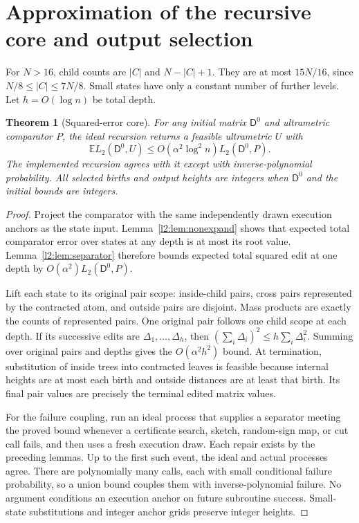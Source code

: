 \documentclass[11pt]{article}
\newtheorem{theorem}{Theorem}[section]
\theoremstyle{definition}
\newcommand{\E}{\mathbb E}
\begin{document}
\section{Approximation of the recursive core and output selection}

For $N>16$, child counts are $|C|$ and $N-|C|+1$. They are at most
$15N/16$, since $N/8\le|C|\le7N/8$. Small states have only a constant
number of further levels. Let $h=O(\log n)$ be total depth.

\begin{theorem}[Squared-error core]\label{l2:thm:core}
For any initial matrix $\mathsf D^0$ and ultrametric comparator $P$, the ideal
recursion returns a feasible ultrametric $U$ with
\[
 \E L_2(\mathsf D^0,U)\le O(\alpha^2\log^2 n)L_2(\mathsf D^0,P).
\]
The implemented recursion agrees with it except with inverse-polynomial
probability. All selected births and output heights are integers when
$\mathsf D^0$ and the initial bounds are integers.
\end{theorem}
\begin{proof}
Project the comparator with the same independently drawn execution
anchors as the state input. Lemma~\ref{l2:lem:nonexpand} shows that expected
total comparator error over states at any depth is at most its root
value. Lemma~\ref{l2:lem:separator} therefore bounds expected total squared
edit at one depth by $O(\alpha^2)L_2(\mathsf D^0,P)$.

Lift each state to its original pair scope: inside-child pairs, cross
pairs represented by the contracted atom, and outside pairs are
disjoint. Mass products are exactly the counts of represented pairs.
One original pair follows one child scope at each depth. If its successive
edits are $\Delta_1,\ldots,\Delta_h$, then
$(\sum_i\Delta_i)^2\le h\sum_i\Delta_i^2$.
Summing over original pairs and depths gives the $O(\alpha^2h^2)$ bound.
At termination, substitution of inside trees into contracted leaves
is feasible because internal heights are at most each birth and
outside distances are at least that birth. Its final pair values are
precisely the terminal edited matrix values.

For the failure coupling, run an ideal process that supplies a separator
meeting the proved bound whenever a certificate search, sketch, random-sign map,
or cut call fails, and then uses a fresh execution draw. Each repair
exists by the preceding lemmas. Up to the first such event, the ideal
and actual processes agree. There are polynomially many calls, each
with small conditional failure probability, so a union bound couples
them with inverse-polynomial failure. No argument conditions an
execution anchor on future subroutine success. Small-state substitutions
and integer anchor grids preserve integer heights.
\end{proof}
\end{document}
